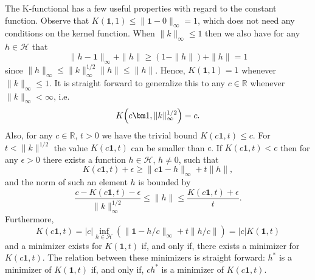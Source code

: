 \documentclass[10pt]{amsart}
\theoremstyle{definition}\newtheorem{defi}[theo]{Definition}\newtheorem{rema}[theo]{Remark}\newtheorem{exam}[theo]{Example}\newtheorem{exem}[theo]{Example}\newtheorem{nota}[theo]{Notation}
\theoremstyle{remark}
\newcommand{\R}{\mathbb{R}}
\newcommand{\cH}{\mathcal{H}}
\let\originalleft\left
\let\originalright\right
\renewcommand{\left}{\mathopen{}\mathclose\bgroup\originalleft}
\renewcommand{\right}{\aftergroup\egroup\originalright}
\begin{document}
The K-functional has a few useful properties with regard to the constant function. Observe that $K(\bm 1,1) \leq \|\bm 1 - 0\|_\infty = 1$, which does not need any conditions on the kernel function. When $\|k\|_\infty \leq 1$ then we also have for any $h\in \cH$ that
\[
\|h - \bm 1\|_\infty + \|h\| \geq (1- \|h\|) + \|h\| = 1
\]
since $\|h\|_\infty \leq \|k\|^{1/2}_\infty \|h\| \leq \|h\|$. Hence, $K(\bm 1,1) = 1$ whenever $\|k\|_\infty \leq 1$. It is straight forward to generalize this to any $c \in \R$ whenever $\|k\|_\infty < \infty$, i.e.
\begin{equation}
K\left(c\bm 1,\|k\|^{1/2}_\infty\right) = c.
\end{equation}
Also, for any $c \in \R$, $t>0$ we have the trivial bound $K(c\bm 1,t) \leq c$. For $t< \|k\|^{1/2}$ the value $K(c \bm 1,t)$ can be smaller than $c$. If $K(c \bm 1,t) < c$ then for any $\epsilon >0$ there exists a function $h\in \cH$, $h\not = 0$, such that
\[
K(c\bm 1,t) + \epsilon \geq \|c \bm 1 - h\|_\infty + t \|h\|,
\]
and the norm of such an element $h$ is bounded by
\[
\frac{c - K(c \bm 1,t) - \epsilon}{\|k\|_\infty^{1/2}} \leq \|h\| \leq \frac{K(c\bm 1,t) + \epsilon}{t}.
\]
Furthermore,
\begin{equation*}
K(c \bm 1, t) = |c| \inf_{h\in \cH} (\|\bm 1 - h/c\|_\infty + t \|h/c\|) = |c| K(\bm 1,t)
\end{equation*}
and a minimizer exists for $K(\bm 1,t)$ if, and only if, there exists a minimizer for $K(c \bm 1,t)$. The relation between these minimizers is straight forward: $h^*$ is a minimizer of $K(\bm 1,t)$ if, and only if, $c h^*$ is a minimizer of $K(c \bm 1,t)$.
\end{document}
